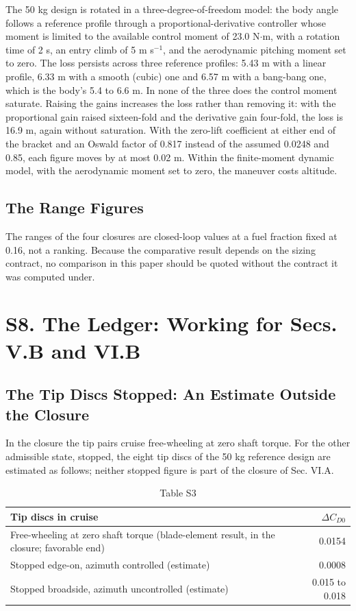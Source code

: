 \documentclass[journal]{new-aiaa}
\begin{document}
The 50 kg design is rotated in a three-degree-of-freedom model: the body angle follows a reference profile through a proportional-derivative controller whose moment is limited to the available control moment of 23.0 N$\cdot$m, with a rotation time of 2 s, an entry climb of 5 m s$^{-1}$, and the aerodynamic pitching moment set to zero. The loss persists across three reference profiles: 5.43 m with a linear profile, 6.33 m with a smooth (cubic) one and 6.57 m with a bang-bang one, which is the body's 5.4 to 6.6 m. In none of the three does the control moment saturate. Raising the gains increases the loss rather than removing it: with the proportional gain raised sixteen-fold and the derivative gain four-fold, the loss is 16.9 m, again without saturation. With the zero-lift coefficient at either end of the bracket and an Oswald factor of 0.817 instead of the assumed 0.0248 and 0.85, each figure moves by at most 0.02 m. Within the finite-moment dynamic model, with the aerodynamic moment set to zero, the maneuver costs altitude.

\subsection*{The Range Figures}

The ranges of the four closures are closed-loop values at a fuel fraction fixed at 0.16, not a ranking. Because the comparative result depends on the sizing contract, no comparison in this paper should be quoted without the contract it was computed under.

\section*{S8. The Ledger: Working for Secs. V.B and VI.B}

\subsection*{The Tip Discs Stopped: An Estimate Outside the Closure}

In the closure the tip pairs cruise free-wheeling at zero shaft torque. For the other admissible state, stopped, the eight tip discs of the 50 kg reference design are estimated as follows; neither stopped figure is part of the closure of Sec. VI.A.

\begin{table}[htbp]
\centering
\caption*{Table S3}
\small
\begin{tabularx}{\linewidth}{Xr}
\hline
Tip discs in cruise & $\Delta C_{D0}$ \\ \hline
Free-wheeling at zero shaft torque (blade-element result, in the closure; favorable end) & 0.0154 \\
Stopped edge-on, azimuth controlled (estimate) & 0.0008 \\
Stopped broadside, azimuth uncontrolled (estimate) & 0.015 to 0.018 \\
\hline
\end{tabularx}
\end{table}
\end{document}
